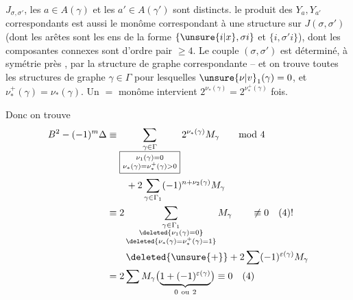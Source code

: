 $J_{\sigma,\sigma'}$,  les $a\in A(\gamma)$ et les $a'\in A(\gamma')$ sont distincts.  le produit des $Y_a,Y_{a'}$ correspondants est aussi le monôme correspondant à une structure   sur $J(\sigma,\sigma')$ (dont les arêtes sont les ens de la forme $\{\unsure{i|x},\sigma i\}$ et $\{i,\sigma'i\}$), dont les composantes connexes sont d'ordre pair $\geq4$. Le couple $(\sigma,\sigma')$ est déterminé, à symétrie près , par la structure de graphe correspondante -- et on trouve  toutes les structures de graphe $\gamma\in\Gamma$ pour lesquelles  $\unsure{\nu|v}_1(\gamma)=0$, et  $\nu_*^+(\gamma)=\nu_*(\gamma)$. Un $=$ monôme intervient $2^{\nu_*(\gamma)}=2^{\nu_*^+(\gamma)}$ fois.

Donc on trouve
\[
\begin{aligned}
B^2-(-1)^m\Delta &\equiv
\sum_{\substack{\gamma\in\Gamma\\\boxed{\substack{\nu_1(\gamma)=0\\\nu_*(\gamma)=\nu_*^+(\gamma)>0}}}}
2^{\nu_*(\gamma)}M_\gamma\qquad\mathrm{mod}\ 4\\
&\qquad+2\sum_{\gamma\in\Gamma_1}(-1)^{n+\nu_2(\gamma)}M_\gamma\\
&\equiv2\sum_{\substack{\gamma\in\Gamma_1\\\deleted{\nu_1(\gamma)=0}\\\deleted{\nu_*(\gamma)=\nu_*^+(\gamma)=1}}}M_\gamma\qquad\not\equiv0\quad(4)!\\
&\qquad\deleted{\unsure{+}}+2\sum(-1)^{\varepsilon(\gamma)}M_\gamma\\
&=2\sum M_\gamma\bigl(\underbrace{1+(-1)^{\varepsilon(\gamma)}}_{0\ \mathrm{ou}\ 2}\bigr)\equiv0\quad(4)
\end{aligned}
\]
